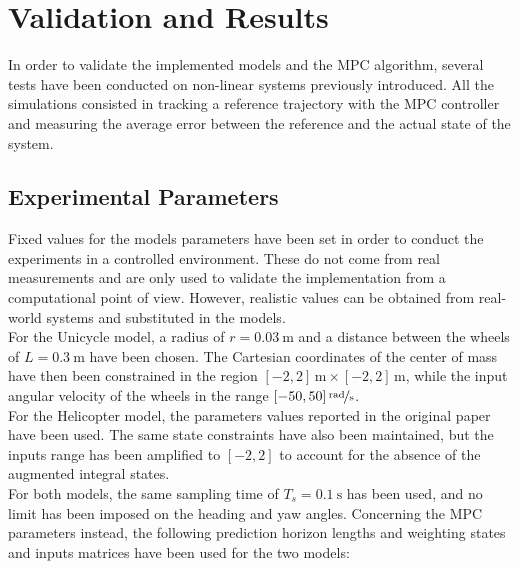 \documentclass[../main.tex]{subfiles}
\begin{document}
\section{Validation and Results}\label{sec:results}

In order to validate the implemented models and the MPC algorithm, several tests
have been conducted on non-linear systems previously introduced. All the simulations
consisted in tracking a reference trajectory with the MPC controller and
measuring the average error between the reference and the actual state of the
system.

\subsection{Experimental Parameters}

Fixed values for the models parameters have been set in order to conduct the
experiments in a controlled environment. 
These do not come from real measurements and are only used to validate the
implementation from a computational point of view. However, realistic values can be obtained from real-world systems and substituted in the models.\\
For the Unicycle model, a radius of $r = \SI{0.03}{\meter}$ and a distance
between the wheels of $L = \SI{0.3}{\meter}$ have been chosen. The Cartesian coordinates of the center of mass have then been constrained in the region $[-2, 2] \,\text{m} \times [-2, 2] \, \text{m}$, while the input angular velocity of the wheels in the range $[-50, 50] \, \nicefrac{\text{rad}}{\text{s}}$.\\
For the Helicopter model, the parameters values  reported in the
original paper~\cite{helicopter} have been used. The same state constraints have
also been maintained, but the inputs range has been amplified to $[-2, 2]$ to
account for the absence of the augmented integral states.\\
For both models, the same sampling time of $T_s = \SI{0.1}{\second}$ has been used, and no
limit has been imposed on the heading and yaw angles. Concerning the MPC
parameters instead, the following prediction horizon lengths and weighting
states and inputs matrices have been used for the two models:
\end{document}
